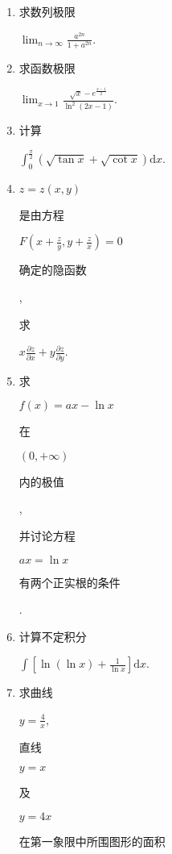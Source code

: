 \documentclass[10pt]{article}
\begin{document}
\begin{enumerate}
  \item \begin{CJK}{UTF8}{mj}求数列极限\end{CJK} $\lim _{n \rightarrow \infty} \frac{a^{2 n}}{1+a^{2 n}}$.

  \item \begin{CJK}{UTF8}{mj}求函数极限\end{CJK} $\lim _{x \rightarrow 1} \frac{\sqrt{x}-e^{\frac{x-1}{2}}}{\ln ^{2}(2 x-1)}$.

  \item \begin{CJK}{UTF8}{mj}计算\end{CJK} $\int_{0}^{\frac{\pi}{2}}(\sqrt{\tan x}+\sqrt{\cot x}) \mathrm{d} x$.

  \item $z=z(x, y)$ \begin{CJK}{UTF8}{mj}是由方程\end{CJK} $F\left(x+\frac{z}{y}, y+\frac{z}{x}\right)=0$ \begin{CJK}{UTF8}{mj}确定的隐函数\end{CJK}, \begin{CJK}{UTF8}{mj}求\end{CJK} $x \frac{\partial z}{\partial x}+y \frac{\partial z}{\partial y}$.

  \item \begin{CJK}{UTF8}{mj}求\end{CJK} $f(x)=a x-\ln x$ \begin{CJK}{UTF8}{mj}在\end{CJK} $(0,+\infty)$ \begin{CJK}{UTF8}{mj}内的极值\end{CJK}, \begin{CJK}{UTF8}{mj}并讨论方程\end{CJK} $a x=\ln x$ \begin{CJK}{UTF8}{mj}有两个正实根的条件\end{CJK}.

  \item \begin{CJK}{UTF8}{mj}计算不定积分\end{CJK} $\int\left[\ln (\ln x)+\frac{1}{\ln x}\right] \mathrm{d} x$.

  \item \begin{CJK}{UTF8}{mj}求曲线\end{CJK} $y=\frac{4}{x}$, \begin{CJK}{UTF8}{mj}直线\end{CJK} $y=x$ \begin{CJK}{UTF8}{mj}及\end{CJK} $y=4 x$ \begin{CJK}{UTF8}{mj}在第一象限中所围图形的面积\end{CJK}


\end{enumerate}
\end{document}
